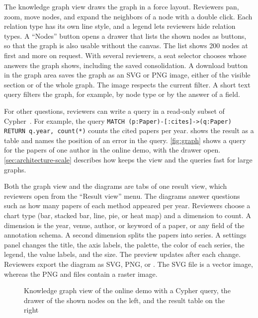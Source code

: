 The knowledge graph view draws the graph in a force layout.
Reviewers pan, zoom, move nodes, and expand the neighbors of a node with a double click.
Each relation type has its own line style, and a legend lets reviewers hide relation types.
A \enquote{Nodes} button opens a drawer that lists the shown nodes as buttons, so that the graph is also usable without the canvas.
The list shows 200 nodes at first and more on request.
With several reviewers, a seat selector chooses whose answers the graph shows, including the saved consolidation.
A download button in the graph area saves the graph as an SVG or PNG image, either of the visible section or of the whole graph.
The image respects the current filter.
A short text query filters the graph, for example, by node type or by the answer of a field.

For other questions, reviewers can write a query in a read-only subset of Cypher~\cite{francis2018cypher}.
For example, the query \texttt{MATCH (p:Paper)-[:cites]->(q:Paper)} \texttt{RETURN q.year, count(*)} counts the cited papers per year.
\SaiLoR shows the result as a table and names the position of an error in the query.
\autoref{fig:graph} shows a query for the papers of one author in the online demo, with the drawer open.
\autoref{sec:architecture-scale} describes how \SaiLoR keeps the view and the queries fast for large graphs.

Both the graph view and the diagrams are tabs of one result view, which reviewers open from the \enquote{Result view} menu.
The diagrams answer questions such as how many papers of each method appeared per year.
Reviewers choose a chart type (bar, stacked bar, line, pie, or heat map) and a dimension to count.
A dimension is the year, venue, author, or keyword of a paper, or any field of the annotation schema.
A second dimension splits the papers into series.
A settings panel changes the title, the axis labels, the palette, the color of each series, the legend, the value labels, and the size.
The preview updates after each change.
Reviewers export the diagram as SVG, PNG, or \PDF.
The SVG file is a vector image, whereas the PNG and \PDF files contain a raster image.

\begin{figure}[t]
    \centering
    \caption{Knowledge graph view of the online demo with a Cypher query, the drawer of the shown nodes on the left, and the result table on the right}
    \label{fig:graph}
\end{figure}

